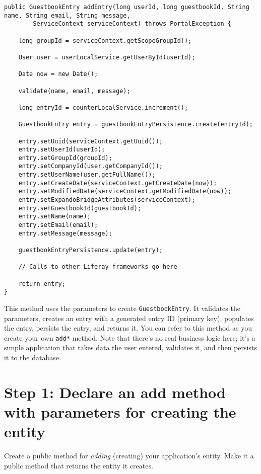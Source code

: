 \begin{verbatim}
public GuestbookEntry addEntry(long userId, long guestbookId, String name, String email, String message,
        ServiceContext serviceContext) throws PortalException {

    long groupId = serviceContext.getScopeGroupId();

    User user = userLocalService.getUserById(userId);

    Date now = new Date();

    validate(name, email, message);

    long entryId = counterLocalService.increment();

    GuestbookEntry entry = guestbookEntryPersistence.create(entryId);

    entry.setUuid(serviceContext.getUuid());
    entry.setUserId(userId);
    entry.setGroupId(groupId);
    entry.setCompanyId(user.getCompanyId());
    entry.setUserName(user.getFullName());
    entry.setCreateDate(serviceContext.getCreateDate(now));
    entry.setModifiedDate(serviceContext.getModifiedDate(now));
    entry.setExpandoBridgeAttributes(serviceContext);
    entry.setGuestbookId(guestbookId);
    entry.setName(name);
    entry.setEmail(email);
    entry.setMessage(message);

    guestbookEntryPersistence.update(entry);

    // Calls to other Liferay frameworks go here

    return entry;
}
\end{verbatim}

This method uses the parameters to create \texttt{GuestbookEntry}. It
validates the parameters, creates an entry with a generated entry ID
(primary key), populates the entry, persists the entry, and returns it.
You can refer to this method as you create your own \texttt{add*}
method. Note that there's no real business logic here; it's a simple
application that takes data the user entered, validates it, and then
persists it to the database.

\section{Step 1: Declare an add method with parameters for creating the
entity}\label{step-1-declare-an-add-method-with-parameters-for-creating-the-entity}

Create a public method for \emph{adding} (creating) your application's
entity. Make it a public method that returns the entity it creates.


